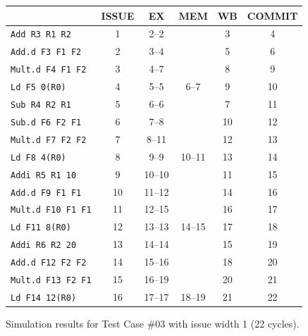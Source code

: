 \documentclass[11pt]{article}
\renewcommand{\_}{\origunderscore\allowbreak}
\begin{document}
\begin{figure}[H]
\centering
\small
\begin{tabular}{lccccc}
\hline
 & ISSUE & EX & MEM & WB & COMMIT \\
\hline
\texttt{Add R3 R1 R2} & 1 & 2--2 &  & 3 & 4 \\
\texttt{Add.d F3 F1 F2} & 2 & 3--4 &  & 5 & 6 \\
\texttt{Mult.d F4 F1 F2} & 3 & 4--7 &  & 8 & 9 \\
\texttt{Ld F5 0(R0)} & 4 & 5--5 & 6--7 & 9 & 10 \\
\texttt{Sub R4 R2 R1} & 5 & 6--6 &  & 7 & 11 \\
\texttt{Sub.d F6 F2 F1} & 6 & 7--8 &  & 10 & 12 \\
\texttt{Mult.d F7 F2 F2} & 7 & 8--11 &  & 12 & 13 \\
\texttt{Ld F8 4(R0)} & 8 & 9--9 & 10--11 & 13 & 14 \\
\texttt{Addi R5 R1 10} & 9 & 10--10 &  & 11 & 15 \\
\texttt{Add.d F9 F1 F1} & 10 & 11--12 &  & 14 & 16 \\
\texttt{Mult.d F10 F1 F1} & 11 & 12--15 &  & 16 & 17 \\
\texttt{Ld F11 8(R0)} & 12 & 13--13 & 14--15 & 17 & 18 \\
\texttt{Addi R6 R2 20} & 13 & 14--14 &  & 15 & 19 \\
\texttt{Add.d F12 F2 F2} & 14 & 15--16 &  & 18 & 20 \\
\texttt{Mult.d F13 F2 F1} & 15 & 16--19 &  & 20 & 21 \\
\texttt{Ld F14 12(R0)} & 16 & 17--17 & 18--19 & 21 & 22 \\
\hline
\end{tabular}
\caption{Simulation results for Test Case \#03 with issue width 1 (22 cycles).}
\end{figure}
\end{document}
